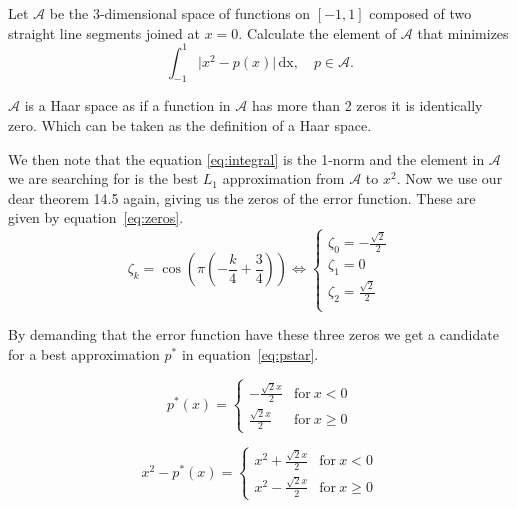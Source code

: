 \begin{problem}
  Let $\mathcal{A}$ be the 3-dimensional space of functions on
  $[-1,1]$ composed of two straight line segments joined at $x =
  0$. Calculate the element of $\mathcal{A}$ that minimizes
  \begin{equation}
    \label{eq:integral}
\int_{-1}^1 \lvert x^2 - p(x) \rvert \, \text{dx}, \quad p \in \mathcal{A}.
\end{equation}
\end{problem}


\begin{solution}
$\mathcal{A}$ is a Haar space as if a function in $\mathcal{A}$ has
more than 2 zeros it is identically zero. Which can be taken as the
definition of a Haar space.

We then note that the equation \ref{eq:integral} is the 1-norm and the
element in $\mathcal{A}$ we are searching for is the best $L_1$
approximation from $\mathcal{A}$ to $x^2$. Now we use our dear theorem
14.5 again, giving us the zeros of the error function. These are given
by equation~\ref{eq:zeros}.
\begin{equation}
  \label{eq:zeros}
\zeta_k = \cos{\left (\pi \left(- \frac{k}{4} + \frac{3}{4}\right)
  \right )}
  \Leftrightarrow
  \begin{cases}
    \zeta_0 = - \frac{\sqrt{2}}{2} \\
    \zeta_1 = 0 \\
    \zeta_2 = \frac{\sqrt{2}}{2} \\
  \end{cases}
\end{equation}

By demanding that the error function have these three zeros we get a
candidate for a best approximation $p^*$ in
equation~\ref{eq:pstar}.

\begin{equation}
  \label{eq:pstar}
  p^*(x)  = 
  \begin{cases}
    - \frac{\sqrt{2} x}{2} & \text{for}\: x < 0 \\
    \frac{\sqrt{2} x }{2} & \text{for}\: x \geq 0    
  \end{cases}
\end{equation}

\begin{equation}
  \label{eq:task_4:error}
  x^2 - p^*(x)  = 
  \begin{cases}
    x^{2} + \frac{\sqrt{2} x}{2} & \text{for}\: x < 0 \\
    x^{2} - \frac{\sqrt{2} x}{2} & \text{for}\: x \geq 0
  \end{cases}
\end{equation}


\end{solution}
